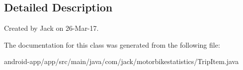 \subsection{Detailed Description}
Created by Jack on 26-\/\+Mar-\/17. 

The documentation for this class was generated from the following file\+:\begin{DoxyCompactItemize}
\item 
android-\/app/app/src/main/java/com/jack/motorbikestatistics/Trip\+Item.\+java\end{DoxyCompactItemize}

